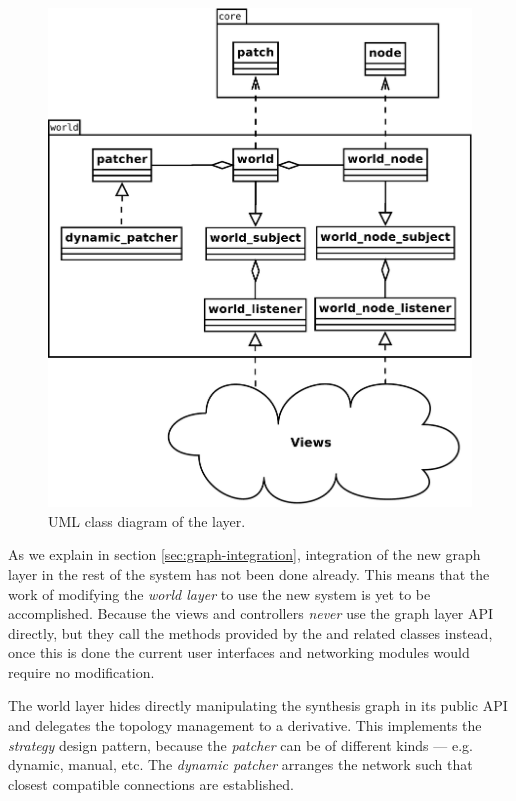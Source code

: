\begin{figure}[h!]
  \centering
  \includegraphics[width=\textwidth]{pic/world.pdf}
  \caption{UML class diagram of the  layer.}
  \label{fig:world}
\end{figure}

As we explain in section \ref{sec:graph-integration}, integration
of the new graph layer in the rest of the system has not been done
already. This means that the work of modifying the \emph{world layer}
to use the new system is yet to be accomplished. Because the views and
controllers \emph{never} use the graph layer API directly, but they
call the methods provided by the  and related classes
instead, once this is done the current user interfaces and networking
modules would require no modification.

The world layer hides directly manipulating the synthesis graph in its
public API and delegates the topology management to a 
derivative. This implements the
\emph{strategy} design pattern, because the \emph{patcher} can be of
different kinds --- e.g. dynamic, manual, etc. The \emph{dynamic
  patcher} arranges the network such that closest compatible
connections are established.

